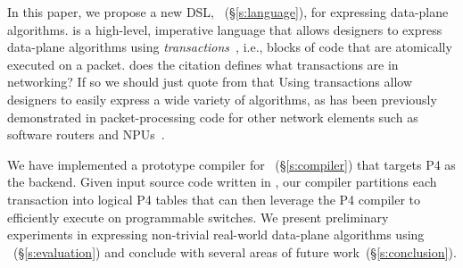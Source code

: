 %


In this paper, we propose a new DSL, \pktlanguage~(\S\ref{s:language}), for
expressing data-plane algorithms. \pktlanguage is a high-level, imperative
language that allows designers to express data-plane algorithms using
{\em transactions}~\cite{transactions}, i.e., blocks of code that 
are atomically executed on a packet.
\ac{does the citation defines what transactions are in networking? If so we should just
quote from that}
Using transactions allow designers to easily express a wide variety of algorithms, as
has been previously demonstrated in packet-processing code for other network
elements such as software routers and NPUs~\cite{click, intel, qdisc}.

We have implemented a prototype compiler for
\pktlanguage~(\S\ref{s:compiler}) that targets P4 as the backend. Given input source
code written in \pktlanguage, our compiler partitions each transaction into logical
P4 tables that can then leverage the P4 compiler to efficiently execute on
programmable switches.  We present preliminary experiments in
expressing non-trivial real-world data-plane algorithms using
\pktlanguage~(\S\ref{s:evaluation}) and conclude with several areas of
future work~(\S\ref{s:conclusion}).
